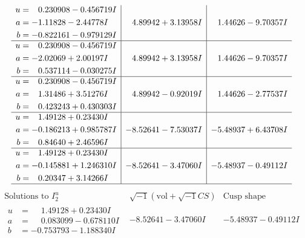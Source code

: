 \documentclass[1p]{elsarticle_modified}
\theoremstyle{definition}
\newcommand{\I}{\sqrt{-1}}
\begin{document}
$$\begin{array}{c|c|c}
\begin{aligned}
u &= \phantom{-}0.230908 - 0.456719 I \\
a &= -1.11828 - 2.44778 I \\
b &= -0.822161 - 0.979129 I\end{aligned}
 & \phantom{-}4.89942 + 3.13958 I & \phantom{-}1.44626 - 9.70357 I \\ \hline\begin{aligned}
u &= \phantom{-}0.230908 - 0.456719 I \\
a &= -2.02069 + 2.00197 I \\
b &= \phantom{-}0.537114 - 0.030275 I\end{aligned}
 & \phantom{-}4.89942 + 3.13958 I & \phantom{-}1.44626 - 9.70357 I \\ \hline\begin{aligned}
u &= \phantom{-}0.230908 - 0.456719 I \\
a &= \phantom{-}1.31486 + 3.51276 I \\
b &= \phantom{-}0.423243 + 0.430303 I\end{aligned}
 & \phantom{-}4.89942 - 0.92019 I & \phantom{-}1.44626 - 2.77537 I \\ \hline\begin{aligned}
u &= \phantom{-}1.49128 + 0.23430 I \\
a &= -0.186213 + 0.985787 I \\
b &= \phantom{-}0.84640 + 2.46596 I\end{aligned}
 & -8.52641 - 7.53037 I & -5.48937 + 6.43708 I \\ \hline\begin{aligned}
u &= \phantom{-}1.49128 + 0.23430 I \\
a &= -0.145881 + 1.246310 I \\
b &= \phantom{-}0.20347 + 3.14266 I\end{aligned}
 & -8.52641 - 3.47060 I & -5.48937 - 0.49112 I\\
 \hline 
 \end{array}$$\newpage$$\begin{array}{c|c|c}  
\text{Solutions to }I^u_{2}& \I (\text{vol} + \sqrt{-1}CS) & \text{Cusp shape}\\
 \hline 
\begin{aligned}
u &= \phantom{-}1.49128 + 0.23430 I \\
a &= \phantom{-}0.083099 - 0.678110 I \\
b &= -0.753793 - 1.188340 I\end{aligned}
 & -8.52641 - 3.47060 I & -5.48937 - 0.49112 I \\ \hline\begin{aligned}

\end{aligned}
\end{array}$$
\end{document}
